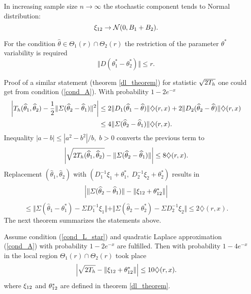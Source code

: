 \begin{remark} 
\label{dxi_limit}
In increasing sample size $n \to \infty$ the stochastic component tends to Normal distribution: 
\[
\xi_{12} \to \mathcal{N}(0, B_1 + B_2).
\]
\end{remark}

\begin{remark}
For the condition $\widehat{\theta} \in \Theta_1(r) \cap \Theta_2(r)$ the restriction of the parameter  $\theta^*$  variability is required
\begin{equation}\label{cond_L_star}
\tag{L*}
\Vert D(\theta_1^* - \theta_2^*) \Vert \leq r.
\end{equation}
\end{remark}

Proof of  a similar statement (theorem \ref{dl_theorem}) for statistic $\sqrt{2 T_h}$ one could get from condition (\ref{cond_A}). With probability $1 - 2e^{-x}$
\begin{align*}
\left| T_h (\widehat{\theta}_1, \widehat{\theta}_2) - \frac{1}{2} \Vert \varSigma (\widehat{\theta}_2 -\widehat{\theta}_1) \Vert^2 \right|  
&\leq
2 \Vert D_1(\widehat{\theta}_1 - \widehat{\theta}) \Vert \diamondsuit (r, x) + 2 \Vert D_2(\widehat{\theta}_2 - \widehat{\theta}) \Vert \diamondsuit (r, x) \\ 
&\leq  4  \Vert  \varSigma(\widehat{\theta}_2 - \widehat{\theta}_1)  \Vert  \diamondsuit (r, x).
\end{align*}
Inequality $|a - b| \leq |a^2 - b^2| / b, \; b >0$ converts the previous term to
\[
\left| \sqrt{ 2  T_h (\widehat{\theta}_1, \widehat{\theta}_2) } -  \Vert \varSigma (\widehat{\theta}_2 -\widehat{\theta}_1) \Vert \right| \leq 
8   \diamondsuit (r, x).
\]
Replacement $(\widehat{\theta}_1, \widehat{\theta}_2)$ with $(D_1^{-1}\xi_1 + \theta_1^*, \; D_2^{-1}\xi_2 + \theta_2^*)$ results in
\[
\left| \Vert \varSigma (\widehat{\theta}_2 -\widehat{\theta}_1) \Vert  - 
\Vert  \xi_{12} +  \theta_{12}^* \Vert 
\right | 
\]
\[
\leq  \Vert \Sigma(\widehat{\theta}_1 - \theta_1^*) - \Sigma D_1^{-1} \xi_1 \Vert
+ \Vert \Sigma(\widehat{\theta}_2 - \theta_2^*) - \Sigma D_2^{-1} \xi_2 \Vert
\leq  2 \diamondsuit (r, x).
\]
The next theorem summarizes the statements above.  
\begin{theorem}
\label{dl_sq_theorem}
Assume condition (\ref{cond_L_star}) and quadratic Laplace approximation (\ref{cond_A}) with probability $1 - 2 e^{-x}$ are fulfilled. Then  with probability $1 - 4 e^{-x}$ in the local region  $\Theta_1(r) \cap \Theta_2(r)$ took place
\[
\left| 
\sqrt{ 2T_h} - 
\Vert \xi_{12} + \theta_{12}^* \Vert 
\right| \leq 
10  \diamondsuit (r, x).
\]
where $\xi_{12}$ and $\theta_{12}^*$ are defined in theorem \ref{dl_theorem}.
\end{theorem}

